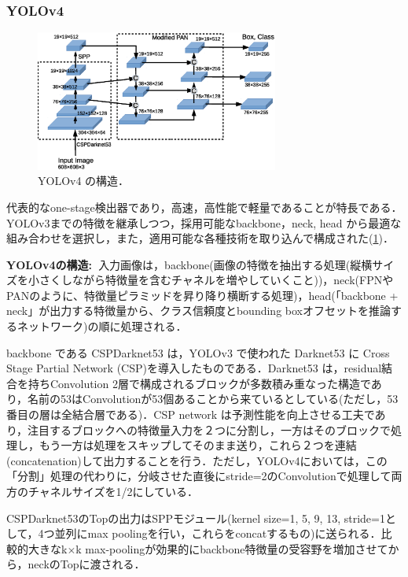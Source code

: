 \documentclass[originalpaper]{jsaiart}     %
\begin{document}
\subsubsection{YOLOv4}
\begin{figure}[tb]
    \begin{center}
        \includegraphics[width=8cm,clip]{fig/archi_YOLOv4.eps}
    \end{center}
    \caption{ YOLOv4 の構造．}
    \label{fig:archi_YOLOv4}
\end{figure}
代表的なone-stage検出器であり，高速，高性能で軽量であることが特長である\cite{BWL20}．YOLOv3までの特徴を継承しつつ，採用可能なbackbone，neck, head から最適な組み合わせを選択し，また，適用可能な各種技術を取り込んで構成された(\ref{fig:archi_YOLOv4})．

{\bf YOLOv4の構造:\ }入力画像は，backbone(画像の特徴を抽出する処理(縦横サイズを小さくしながら特徴量を含むチャネルを増やしていくこと))，neck(FPNやPANのように、特徴量ピラミッドを昇り降り横断する処理)，head(「backbone + neck」が出力する特徴量から、クラス信頼度とbounding boxオフセットを推論するネットワーク)の順に処理される．

backbone である CSPDarknet53 は，YOLOv3 で使われた Darknet53 に Cross Stage Partial Network (CSP)を導入したものである．Darknet53 は，residual結合を持ちConvolution 2層で構成されるブロックが多数積み重なった構造であり，名前の53はConvolutionが53個あることから来ているとしている(ただし，53番目の層は全結合層である)．CSP network は予測性能を向上させる工夫であり，注目するブロックへの特徴量入力を２つに分割し，一方はそのブロックで処理し，もう一方は処理をスキップしてそのまま送り，これら２つを連結(concatenation)して出力することを行う．ただし，YOLOv4においては，この「分割」処理の代わりに，分岐させた直後にstride=2のConvolutionで処理して両方のチャネルサイズを1/2にしている．

CSPDarknet53のTopの出力はSPPモジュール(kernel size={1, 5, 9, 13}, stride=1として，4つ並列にmax poolingを行い，これらをconcatするもの)に送られる．比較的大きなk$\times$k max-poolingが効果的にbackbone特徴量の受容野を増加させてから，neckのTopに渡される．
\end{document}
